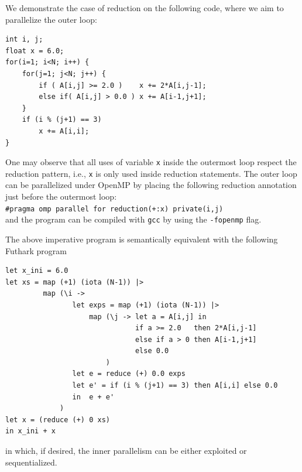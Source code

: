 \documentclass[acmsmall,review]{acmart}\settopmatter{printfolios=true,printccs=false,printacmref=false}
\begin{document}
We demonstrate the case of reduction on the following code,
where we aim to parallelize the outer loop:
\begin{lstlisting}[mathescape=true]
int i, j;
float x = 6.0;
for(i=1; i<N; i++) {
    for(j=1; j<N; j++) {
        if ( A[i,j] >= 2.0 )    x += 2*A[i,j-1];
        else if( A[i,j] > 0.0 ) x += A[i-1,j+1];
    }
    if (i % (j+1) == 3) 
        x += A[i,i];
}
\end{lstlisting}

One may observe that all uses of variable {\tt x} inside
the outermost loop respect the reduction pattern, i.e.,
{\tt x} is only used inside reduction statements. The
outer loop can be parallelized under OpenMP by placing 
the following reduction annotation just before
the outermost loop:\\
{\tt\#pragma omp parallel for reduction(+:x) private(i,j)}\\
and the program can be compiled with {\tt gcc} by using
the {\tt -fopenmp} flag.

The above imperative program is semantically equivalent
with the following Futhark program
\begin{lstlisting}[mathescape=true]
let x_ini = 6.0
let xs = map (+1) (iota (N-1)) |> 
         map (\i ->
                let exps = map (+1) (iota (N-1)) |>
                    map (\j -> let a = A[i,j] in
                               if a >= 2.0   then 2*A[i,j-1]
                               else if a > 0 then A[i-1,j+1]
                               else 0.0
                        )
                let e = reduce (+) 0.0 exps
                let e' = if (i % (j+1) == 3) then A[i,i] else 0.0
                in  e + e'
             )
let x = (reduce (+) 0 xs)
in x_ini + x
\end{lstlisting}\vspace{-2ex}
in which, if desired, the inner parallelism can be either exploited
or sequentialized.
\end{document}
